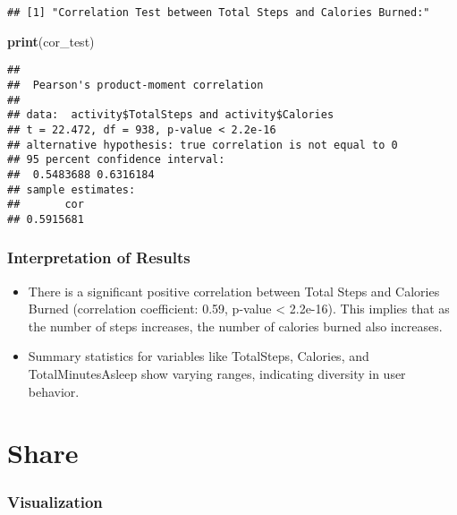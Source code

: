 \documentclass[
]{article}
\newenvironment{Shaded}{\begin{snugshade}}{\end{snugshade}}
\newcommand{\FunctionTok}[1]{\textcolor[rgb]{0.13,0.29,0.53}{\textbf{#1}}}
\newcommand{\NormalTok}[1]{#1}
\providecommand{\tightlist}{%
  \setlength{\itemsep}{0pt}\setlength{\parskip}{0pt}}
\begin{document}
\begin{verbatim}
## [1] "Correlation Test between Total Steps and Calories Burned:"
\end{verbatim}

\begin{Shaded}
\begin{Highlighting}[]
\FunctionTok{print}\NormalTok{(cor\_test)}
\end{Highlighting}
\end{Shaded}

\begin{verbatim}
## 
##  Pearson's product-moment correlation
## 
## data:  activity$TotalSteps and activity$Calories
## t = 22.472, df = 938, p-value < 2.2e-16
## alternative hypothesis: true correlation is not equal to 0
## 95 percent confidence interval:
##  0.5483688 0.6316184
## sample estimates:
##       cor 
## 0.5915681
\end{verbatim}

\hypertarget{interpretation-of-results}{%
\subsubsection{Interpretation of
Results}\label{interpretation-of-results}}

\begin{itemize}
\tightlist
\item
  There is a significant positive correlation between Total Steps and
  Calories Burned (correlation coefficient: 0.59, p-value \textless{}
  2.2e-16). This implies that as the number of steps increases, the
  number of calories burned also increases.
\item
  Summary statistics for variables like TotalSteps, Calories, and
  TotalMinutesAsleep show varying ranges, indicating diversity in user
  behavior.
\end{itemize}

\hypertarget{share}{%
\section{Share}\label{share}}

\hypertarget{visualization}{%
\subsubsection{Visualization}\label{visualization}}
\end{document}

